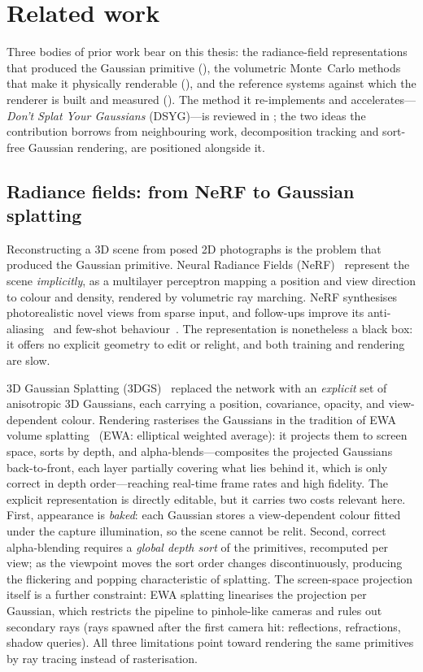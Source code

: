 \chapter{Related work}
\label{ch:related-work}

Three bodies of prior work bear on this thesis: the radiance-field representations that
produced the Gaussian primitive (), the volumetric Monte~Carlo
methods that make it physically renderable (), and the reference
systems against which the renderer is built and measured
(). The method it
re-implements and accelerates---\emph{Don't Splat Your Gaussians} (DSYG)---is reviewed in
; the two ideas the contribution borrows from neighbouring work, decomposition
tracking and sort-free Gaussian rendering, are positioned alongside it.

\section{Radiance fields: from NeRF to Gaussian splatting}
\label{sec:radiance-fields}

Reconstructing a 3D scene from posed 2D photographs is the problem that produced the Gaussian
primitive. Neural Radiance Fields (NeRF)~\cite{NeRF} represent the scene \emph{implicitly}, as a
multilayer perceptron mapping a position and view direction to colour and density, rendered by
volumetric ray marching. NeRF synthesises photorealistic novel views from sparse input, and
follow-ups improve its anti-aliasing~\cite{MipNeRF} and few-shot behaviour~\cite{PixelNeRF}. The
representation is nonetheless a black box: it offers no explicit geometry to edit or relight, and both
training and rendering are slow.

3D Gaussian Splatting (3DGS)~\cite{3DGS} replaced the network with an \emph{explicit} set of
anisotropic 3D Gaussians, each carrying a position, covariance, opacity, and view-dependent colour.
Rendering rasterises the Gaussians in the tradition of EWA volume
splatting~\cite{Zwicker2001} (EWA: elliptical weighted average): it projects them to
screen space, sorts by depth, and alpha-blends---composites the projected Gaussians
back-to-front, each layer partially covering what lies behind it, which is only correct in
depth order---reaching real-time frame rates and high fidelity. The explicit representation
is directly editable, but it carries two costs relevant here. First, appearance is \emph{baked}: each
Gaussian stores a view-dependent colour fitted under the capture illumination, so the scene cannot be
relit. Second, correct alpha-blending requires a \emph{global depth sort} of the primitives, recomputed
per view; as the viewpoint moves the sort order changes discontinuously, producing the flickering and
popping characteristic of splatting. The screen-space projection itself is a further
constraint: EWA splatting linearises the projection per Gaussian, which restricts the
pipeline to pinhole-like cameras and rules out secondary rays (rays spawned after the
first camera hit: reflections, refractions, shadow queries). All three limitations point
toward rendering the same primitives by ray tracing instead of rasterisation.


